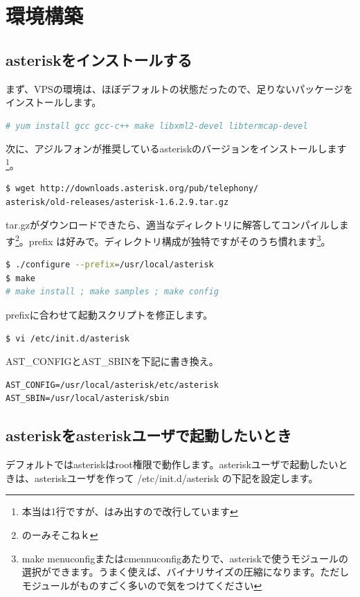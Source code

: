 \section{環境構築}
\subsection{asteriskをインストールする}

まず、VPSの環境は、ほぼデフォルトの状態だったので、足りないパッケージをインストールします。

\begin{lstlisting}[language=bash]
# yum install gcc gcc-c++ make libxml2-devel libtermcap-devel
\end{lstlisting}

次に、アジルフォンが推奨しているasteriskのバージョンをインストールします\footnote{本当は1行ですが、はみ出すので改行しています}。

\begin{lstlisting}[language=bash]
$ wget http://downloads.asterisk.org/pub/telephony/
asterisk/old-releases/asterisk-1.6.2.9.tar.gz
\end{lstlisting}

tar.gzがダウンロードできたら、適当なディレクトリに解答してコンパイルします\footnote{のーみそこねｋ}。prefix は好みで。ディレクトリ構成が独特ですがそのうち慣れます\footnote{make menuconfigまたはcmennuconfigあたりで、asteriskで使うモジュールの選択ができます。うまく使えば、バイナリサイズの圧縮になります。ただしモジュールがものすごく多いので気をつけてください}。

\begin{lstlisting}[language=bash]
$ ./configure --prefix=/usr/local/asterisk
$ make
# make install ; make samples ; make config
\end{lstlisting}

prefixに合わせて起動スクリプトを修正します。

\begin{lstlisting}[language=bash]
$ vi /etc/init.d/asterisk
\end{lstlisting}

AST\_CONFIGとAST\_SBINを下記に書き換え。

\begin{lstlisting}
AST_CONFIG=/usr/local/asterisk/etc/asterisk
AST_SBIN=/usr/local/asterisk/sbin
\end{lstlisting}

\subsection{asteriskをasteriskユーザで起動したいとき}
デフォルトではasteriskはroot権限で動作します。asteriskユーザで起動したいときは、asteriskユーザを作って /etc/init.d/asterisk の下記を設定します。

